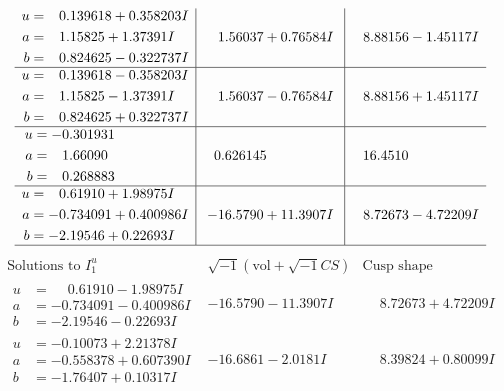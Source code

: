 \documentclass[1p]{elsarticle_modified}
\theoremstyle{definition}
\newcommand{\I}{\sqrt{-1}}
\begin{document}
$$\begin{array}{c|c|c}
\begin{aligned}
u &= \phantom{-}0.139618 + 0.358203 I \\
a &= \phantom{-}1.15825 + 1.37391 I \\
b &= \phantom{-}0.824625 - 0.322737 I\end{aligned}
 & \phantom{-}1.56037 + 0.76584 I & \phantom{-}8.88156 - 1.45117 I \\ \hline\begin{aligned}
u &= \phantom{-}0.139618 - 0.358203 I \\
a &= \phantom{-}1.15825 - 1.37391 I \\
b &= \phantom{-}0.824625 + 0.322737 I\end{aligned}
 & \phantom{-}1.56037 - 0.76584 I & \phantom{-}8.88156 + 1.45117 I \\ \hline\begin{aligned}
u &= -0.301931\phantom{ +0.000000I} \\
a &= \phantom{-}1.66090\phantom{ +0.000000I} \\
b &= \phantom{-}0.268883\phantom{ +0.000000I}\end{aligned}
 & \phantom{-}0.626145\phantom{ +0.000000I} & \phantom{-}16.4510\phantom{ +0.000000I} \\ \hline\begin{aligned}
u &= \phantom{-}0.61910 + 1.98975 I \\
a &= -0.734091 + 0.400986 I \\
b &= -2.19546 + 0.22693 I\end{aligned}
 & -16.5790 + 11.3907 I & \phantom{-}8.72673 - 4.72209 I\\
 \hline 
 \end{array}$$\newpage$$\begin{array}{c|c|c}  
\text{Solutions to }I^u_{1}& \I (\text{vol} + \sqrt{-1}CS) & \text{Cusp shape}\\
 \hline 
\begin{aligned}
u &= \phantom{-}0.61910 - 1.98975 I \\
a &= -0.734091 - 0.400986 I \\
b &= -2.19546 - 0.22693 I\end{aligned}
 & -16.5790 - 11.3907 I & \phantom{-}8.72673 + 4.72209 I \\ \hline\begin{aligned}
u &= -0.10073 + 2.21378 I \\
a &= -0.558378 + 0.607390 I \\
b &= -1.76407 + 0.10317 I\end{aligned}
 & -16.6861 - 2.0181 I & \phantom{-}8.39824 + 0.80099 I \\ \hline\begin{aligned}

\end{aligned}
\end{array}$$
\end{document}
